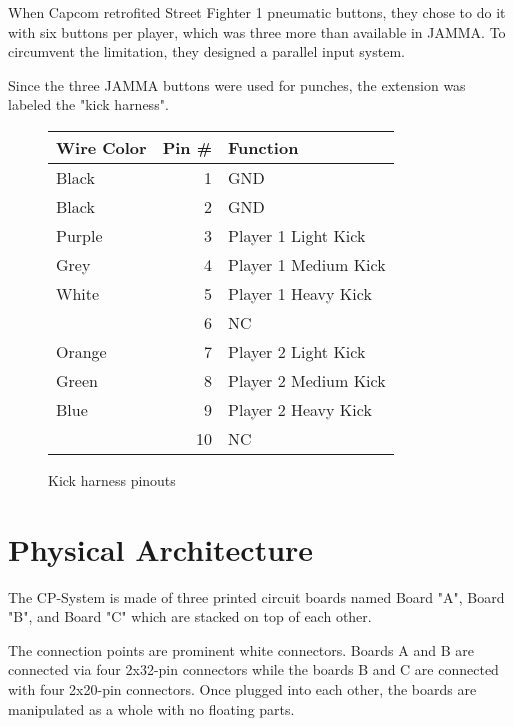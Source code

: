 When Capcom retrofited Street Fighter 1 pneumatic buttons, they chose to do it with six buttons per player, which was three more than available in JAMMA. To circumvent the limitation, they designed a parallel input system. 

Since the three JAMMA buttons were used for punches, the extension was labeled the "kick harness".

\begin{figure}[H]

\begin{tabularx}{\textwidth}{lrX}
  \toprule    
  \textbf{Wire Color } & \textbf{ Pin \#}  & \textbf{Function } \\               
  \toprule   
  Black & 1 & GND \\
  Black & 2 & GND \\
  \toprule   
  Purple & 3 & Player 1 Light Kick \\
  Grey & 4 & Player 1 Medium Kick \\
  White & 5 & Player 1 Heavy Kick \\
  \toprule   
  & 6 & NC \\
  \toprule   
  Orange & 7 & Player 2 Light Kick\\
  Green & 8 & Player 2 Medium Kick\\
  Blue & 9 & Player 2 Heavy Kick\\
  \toprule   
  & 10 & NC \\
  \toprule   
\end{tabularx}
\caption*{Kick harness pinouts}
\end{figure}










  


\section{Physical Architecture}
 The CP-System is made of three printed circuit boards named Board "A", Board "B", and Board "C" which are stacked on top of each other.


\begin{figure}[H]
\centering
{}
\end{figure}

\pagebreak
The connection points are prominent white connectors. Boards A and B are connected via four 2x32-pin connectors while the boards B and C are connected with four 2x20-pin connectors.  Once plugged into each other, the boards are manipulated as a whole with no floating parts.


